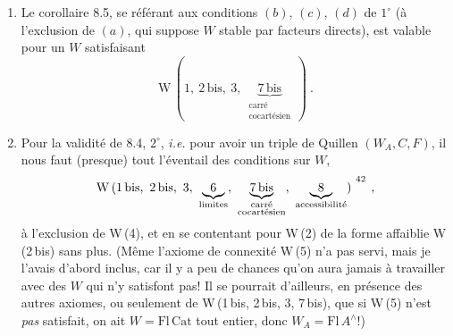 \begin{enumerate}[leftmargin=2.5em]
\item[$2^\circ$)] Le corollaire 8.5, se référant aux conditions $(b)$, $(c)$, $(d)$ de $1^\circ$ (à l'exclusion de $(a)$, qui suppose $W$ stable par facteurs directs), est valable pour un $W$ satisfaisant
\[
\mathrm{W}\,(1,\ 2\,\mathrm{bis},\ 3,\ \underbrace{7\,\mathrm{bis}}_{\substack{\text{carré}\\ \text{cocartésien}}}\,)\ .
\]
\item[$3^\circ$)] Pour la validité de 8.4, $2^\circ$, \textit{i.e.} pour avoir un triple de Quillen $(W_A,C,F)$, il nous faut (presque) tout l'éventail des conditions sur $W$,
\[
\mathrm{W}\,(1\,\mathrm{bis},\ 2\,\mathrm{bis},\ 3,\ \underbrace{\ 6\ }_{\text{limites}},\ \underbrace{7\,\mathrm{bis}}_{\substack{\text{carré}\\ \text{cocartésien}}},\ \underbrace{\ 8\ }_{\text{accessibilité}})\ ^{\footnotemark[42]}\ ,
\]
à l'exclusion de W\,(4), et en se contentant pour W\,(2) de la forme affaiblie W\,(2\,bis) sans plus. (Même l'axiome de connexité W\,(5) n'a pas servi, mais je l'avais d'abord inclus, car il y a peu de chances qu'on aura jamais à travailler avec des $W$ qui n'y satisfont pas! Il se pourrait d'ailleurs, en présence des autres axiomes, ou seulement de W\,(1\,bis, 2\,bis, 3, 7\,bis), que si W\,(5) n'est \textit{pas} satisfait, on ait $W = \mathrm{Fl}\,\mathrm{Cat}$ tout entier, donc $W_A = \mathrm{Fl}\,A^\wedge$!)
\end{enumerate}


